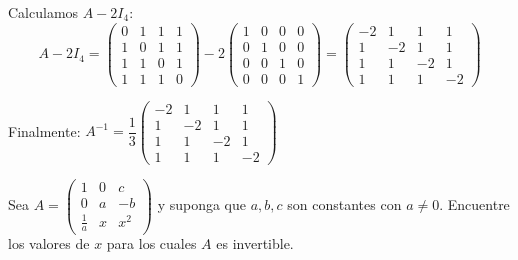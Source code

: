 \begin{myproof}
Calculamos $A - 2I_4$:
\[
A - 2I_4 = \begin{pmatrix}
0 & 1 & 1 & 1 \\
1 & 0 & 1 & 1 \\
1 & 1 & 0 & 1 \\
1 & 1 & 1 & 0
\end{pmatrix} - 2 \begin{pmatrix}
1 & 0 & 0 & 0 \\
0 & 1 & 0 & 0 \\
0 & 0 & 1 & 0 \\
0 & 0 & 0 & 1
\end{pmatrix} = \begin{pmatrix}
-2 & 1 & 1 & 1 \\
1 & -2 & 1 & 1 \\
1 & 1 & -2 & 1 \\
1 & 1 & 1 & -2
\end{pmatrix}
\]

Finalmente: \(
\boxed{A^{-1} = \dfrac{1}{3} \begin{pmatrix}
-2 & 1 & 1 & 1 \\
1 & -2 & 1 & 1 \\
1 & 1 & -2 & 1 \\
1 & 1 & 1 & -2
\end{pmatrix}}
\)
\end{myproof}

\begin{prob} 
Sea  \(A= \left(
\begin{array}{ccc}
1 & 0 & c \\
0 & a & -b \\
\frac{1}{a} & x & x^2 
\end{array}
\right) \) y suponga que $a, b, c$ son constantes con $a\neq 0.$ Encuentre los valores de $x$ para los cuales $A$ es invertible.
\end{prob}

